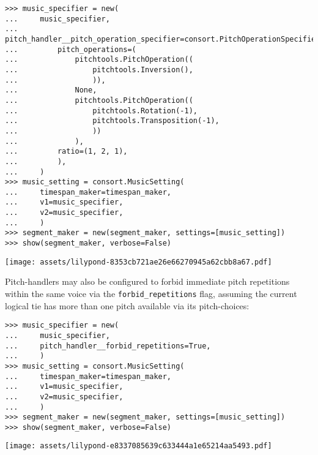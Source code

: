 \begin{abjadbookoutput}
\begin{singlespacing}
\vspace{-0.5\baselineskip}
\begin{lstlisting}
>>> music_specifier = new(
...     music_specifier,
...     pitch_handler__pitch_operation_specifier=consort.PitchOperationSpecifier(
...         pitch_operations=(
...             pitchtools.PitchOperation((
...                 pitchtools.Inversion(),
...                 )),
...             None,
...             pitchtools.PitchOperation((
...                 pitchtools.Rotation(-1),
...                 pitchtools.Transposition(-1),
...                 ))
...             ),
...         ratio=(1, 2, 1),
...         ),
...     )
>>> music_setting = consort.MusicSetting(
...     timespan_maker=timespan_maker,
...     v1=music_specifier,
...     v2=music_specifier,
...     )
>>> segment_maker = new(segment_maker, settings=[music_setting])
>>> show(segment_maker, verbose=False)
\end{lstlisting}
\noindent\texttt{[image: assets/lilypond-8353cb721ae26e66270945a62cbb8a67.pdf]}
\end{singlespacing}
\end{abjadbookoutput}

\noindent Pitch-handlers may also be configured to forbid immediate pitch
repetitions within the same voice via the \texttt{forbid\_repetitions} flag,
assuming the current logical tie has more than one pitch available via its
pitch-choices:

\begin{comment}
<abjad>[stylesheet=../consort.ily]
music_specifier = new(
    music_specifier,
    pitch_handler__forbid_repetitions=True,
    )
music_setting = consort.MusicSetting(
    timespan_maker=timespan_maker,
    v1=music_specifier,
    v2=music_specifier,
    )
segment_maker = new(segment_maker, settings=[music_setting])
show(segment_maker, verbose=False)
</abjad>
\end{comment}

\begin{abjadbookoutput}
\begin{singlespacing}
\vspace{-0.5\baselineskip}
\begin{lstlisting}
>>> music_specifier = new(
...     music_specifier,
...     pitch_handler__forbid_repetitions=True,
...     )
>>> music_setting = consort.MusicSetting(
...     timespan_maker=timespan_maker,
...     v1=music_specifier,
...     v2=music_specifier,
...     )
>>> segment_maker = new(segment_maker, settings=[music_setting])
>>> show(segment_maker, verbose=False)
\end{lstlisting}
\noindent\texttt{[image: assets/lilypond-e8337085639c633444a1e65214aa5493.pdf]}
\end{singlespacing}
\end{abjadbookoutput}

